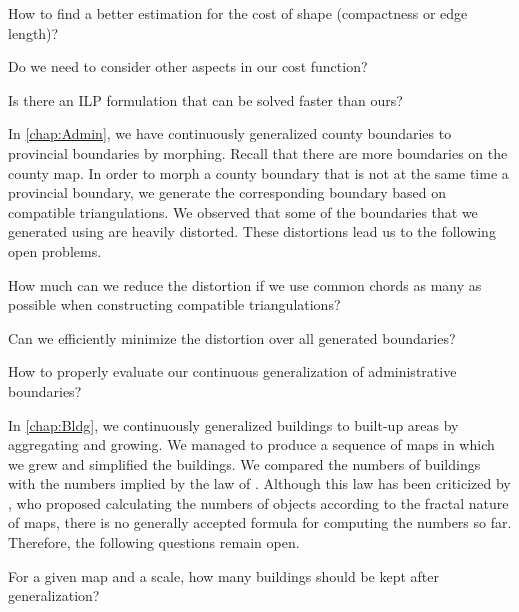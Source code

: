 \begin{open}
How to find a better estimation for the cost of shape 
(compactness or edge length)?
\end{open} 

\begin{open}
Do we need to consider other aspects in our cost function?
\end{open}

\begin{open}
Is there an ILP formulation that can be solved faster than ours?
\end{open}

In \chap\ref{chap:Admin}, 
we have continuously generalized 
county boundaries to provincial boundaries by morphing.
Recall that there are more boundaries on the county map.
In order to morph a county boundary 
that is not at the same time a provincial boundary,
we generate the corresponding boundary based on
compatible triangulations.
We observed that some of the boundaries 
that we generated using are heavily distorted.  
These distortions lead us to the following open problems.

\begin{open}
  How much can we reduce the distortion 
  if we use common chords as many as possible
  when constructing compatible triangulations?
\end{open} 

\begin{open}
  Can we efficiently minimize the distortion 
  over all generated boundaries?
\end{open} 

\begin{open}
  How to properly evaluate our continuous generalization 
  of administrative boundaries?
\end{open}

In \chap\ref{chap:Bldg}, we continuously 
generalized buildings to built-up areas
by aggregating and growing.
We managed to produce a sequence of maps 
in which we grew and simplified the buildings.
We compared the numbers of buildings 
with the numbers implied 
by the law of \textcite{Topfer1966}.
Although this law has been criticized by 
\textcite{Jiang2015Fractal},
who proposed calculating the numbers of objects
according to the fractal nature of maps,
there is no generally accepted formula for 
computing the numbers so far.  
Therefore, the following questions remain open.

\begin{open}
  For a given map and a scale, 
  how many buildings should be kept after generalization?
\end{open}

